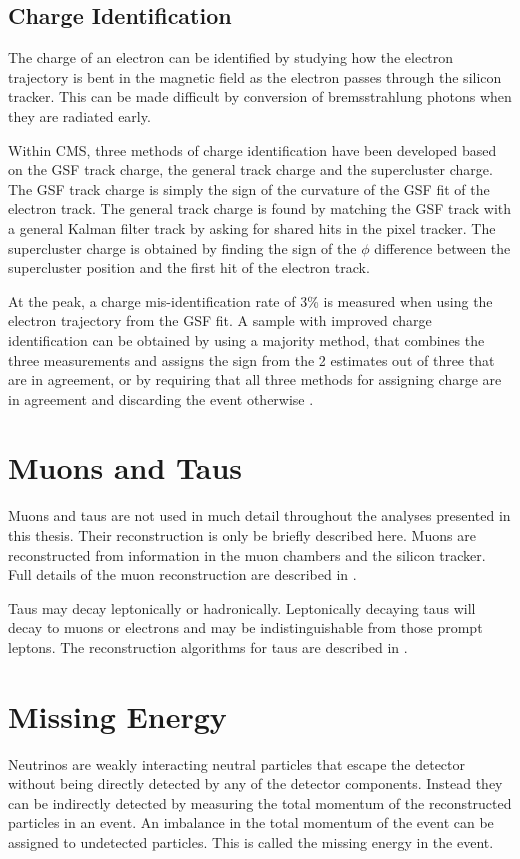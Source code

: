 \subsection{Charge Identification}
\label{sec:charge}
The charge of an electron can be identified by studying how the electron
trajectory is bent in the magnetic field as the electron passes through the
silicon tracker. This can be made difficult by conversion of bremsstrahlung
photons when they are radiated early.

Within CMS, three methods of charge identification have been developed
\cite{adam2009electron}  based on the {GSF} track charge, the general track
charge and the supercluster charge. The {GSF} track charge is simply the sign of
the curvature of the {GSF} fit of the electron track. The general track charge
is found by matching the {GSF} track with a general Kalman filter track by
asking for shared hits in the pixel tracker.  The supercluster charge is
obtained by finding the sign of the $\phi$ difference between the supercluster
position and the first hit of the electron track.

At the \PZ peak, a charge mis-identification rate of \unit{3}{\%}
\cite{adam2009electron} is measured when using the electron trajectory from the
{GSF} fit.  A sample with improved charge identification can be obtained by
using a majority method, that combines the three measurements and assigns the
sign from the 2 estimates out of three that are in agreement, or by requiring
that all three methods for assigning charge are in agreement and discarding the
event otherwise \cite{adam2009electron}.

\section{Muons and Taus}
Muons and taus are not used in much detail throughout the analyses presented in
this thesis. Their reconstruction is only be briefly described here.  Muons are
reconstructed from information in the muon chambers and the silicon tracker.
Full details of the muon reconstruction are described in
\cite{collaboration2010muon}.

Taus may decay leptonically or hadronically. Leptonically decaying taus will
decay to muons or electrons and may be indistinguishable from those prompt
leptons. The reconstruction algorithms for taus are described in
\cite{collaboration2012tau}.

\section{Missing Energy} 
Neutrinos are weakly interacting neutral particles that escape the
detector without being directly detected by any of the detector components. 
Instead they can be indirectly detected by measuring the total momentum of the
reconstructed particles in an event.
An imbalance in the total momentum of the event can be assigned to undetected
particles. This is called the missing energy in the event.


